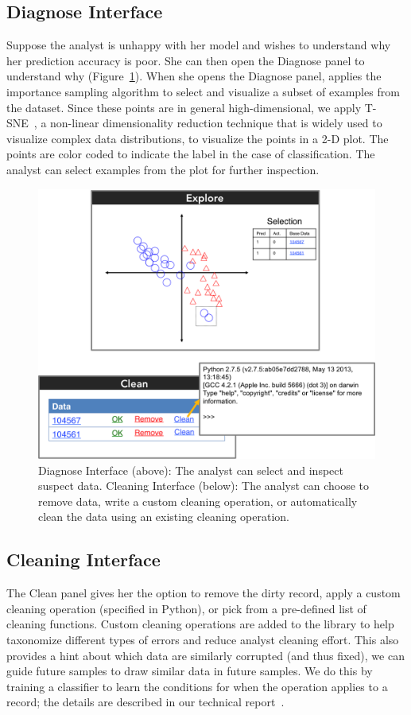 \subsection{Diagnose Interface}
Suppose the analyst is unhappy with her model and wishes to understand why her prediction accuracy is poor.
She can then open the \textsf{Diagnose} panel to understand why (Figure~\ref{diag}).
When she opens the \textsf{Diagnose} panel, \sys applies the importance sampling algorithm to select and visualize a subset of examples from the dataset.
Since these points are in general high-dimensional, we apply T-SNE~\cite{van2008visualizing},
a non-linear dimensionality reduction technique that is widely used to visualize complex data distributions,
to visualize the points in a 2-D plot.
The points are color coded to indicate the label in the case of classification.
The analyst can select examples from the plot for further inspection.

\begin{figure}[t]
\centering
 \includegraphics[width=0.6\columnwidth]{figs/interface3.png}
 \caption{Diagnose Interface (above): The analyst can select and inspect suspect data. 
 Cleaning Interface (below): The analyst can choose to remove data, write a custom cleaning operation, or automatically clean the data using an existing cleaning operation.\label{diag}}
\end{figure}

\subsection{Cleaning Interface}
The \textsf{Clean} panel gives her the option to remove the dirty record, apply a custom cleaning operation (specified in Python), or pick from a pre-defined list of cleaning functions.
Custom cleaning operations are added to the library to help taxonomize different types of errors and reduce analyst cleaning effort.
This also provides a hint about which data are similarly corrupted (and thus fixed), we can guide future samples to draw similar data in future samples.
We do this by training a classifier to learn the conditions for when the operation applies to a record; the  details are described in our technical report~\cite{activecleanarxiv}.

